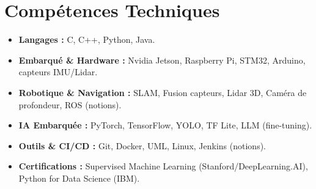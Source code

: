 \documentclass[a4paper,11pt]{article}
\begin{document}
\section{Compétences Techniques}
\begin{itemize}[leftmargin=*, nosep]
    \item \small{\textbf{Langages :} C, C++, Python, Java.}
    \item \small{\textbf{Embarqué \& Hardware :} Nvidia Jetson, Raspberry Pi, STM32, Arduino, capteurs IMU/Lidar.}
    \item \small{\textbf{Robotique \& Navigation :} SLAM, Fusion capteurs, Lidar 3D, Caméra de profondeur, ROS (notions).}
    \item \small{\textbf{IA Embarquée :} PyTorch, TensorFlow, YOLO, TF Lite, LLM (fine-tuning).}
    \item \small{\textbf{Outils \& CI/CD :} Git, Docker, UML, Linux, Jenkins (notions).}
    \item \small{\textbf{Certifications :} Supervised Machine Learning (Stanford/DeepLearning.AI), Python for Data Science (IBM).}
\end{itemize}

\end{document}

